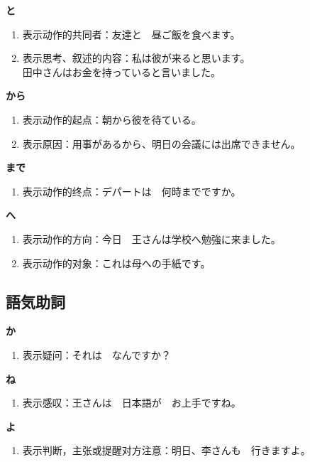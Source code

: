 {\bf
\noindent と
}

\begin{enumerate}
  \item 表示动作的共同者：友達と　昼ご飯を食べます。
  \item 表示思考、叙述的内容：私は彼が来ると思います。\\
    田中さんはお金を持っていると言いました。
\end{enumerate}

{\bf
\noindent から
}

\begin{enumerate}
  \item 表示动作的起点：朝から彼を待ている。
  \item 表示原因：用事があるから、明日の会議には出席できません。
\end{enumerate}

{\bf
\noindent まで
}

\begin{enumerate}
  \item 表示动作的终点：デパートは　何時までですか。
\end{enumerate}

{\bf
\noindent へ
}

\begin{enumerate}
  \item 表示动作的方向：今日　王さんは学校へ勉強に来ました。
  \item 表示动作的对象：これは母への手紙です。
\end{enumerate}



\subsection{語気助詞}%

{\bf
\noindent か
}

\begin{enumerate}
  \item 表示疑问：それは　なんですか？
\end{enumerate}

{\bf
\noindent ね
}

\begin{enumerate}
  \item 表示感叹：王さんは　日本語が　お上手ですね。
\end{enumerate}

{\bf
\noindent よ
}

\begin{enumerate}
  \item 表示判断，主张或提醒对方注意：明日、李さんも　行きますよ。
\end{enumerate}



